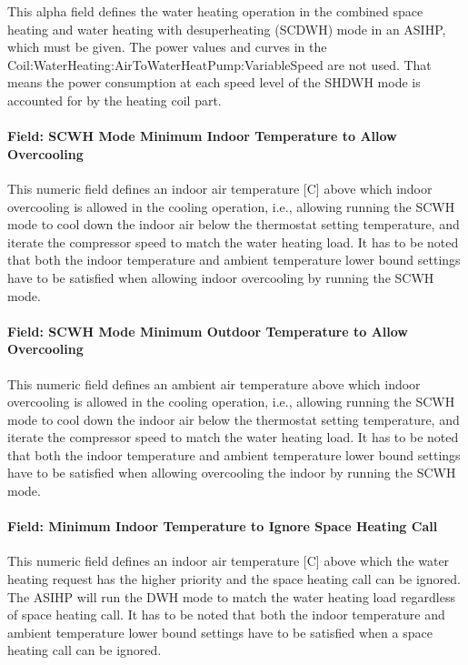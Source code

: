 This alpha field defines the water heating operation in the combined space heating and water heating with desuperheating (SCDWH) mode in an ASIHP, which must be given. The power values and curves in the Coil:WaterHeating:AirToWaterHeatPump:VariableSpeed are not used. That means the power consumption at each speed level of the SHDWH mode is accounted for by the heating coil part.

\paragraph{Field: SCWH Mode Minimum Indoor Temperature to Allow  Overcooling}\label{Field-SCWH-Minimum-In-Overcooling-ASIHP}

This numeric field defines an indoor air temperature [C] above which indoor overcooling is allowed in the cooling operation, i.e., allowing running the SCWH mode to cool down the indoor air below the thermostat setting temperature, and iterate the compressor speed to match the water heating load. It has to be noted that both the indoor temperature and ambient temperature lower bound settings have to be satisfied when allowing indoor overcooling by running the SCWH mode.


\paragraph{Field: SCWH Mode Minimum Outdoor Temperature to Allow Overcooling}\label{Field-SCWH-Minimum-Outdoor-ASIHP}

This numeric field defines an ambient air temperature above which indoor overcooling is allowed in the cooling operation, i.e., allowing running the SCWH mode to cool down the indoor air below the thermostat setting temperature, and iterate the compressor speed to match the water heating load. It has to be noted that both the indoor temperature and ambient temperature lower bound settings have to be satisfied when allowing overcooling the indoor by running the SCWH mode.

\paragraph{Field: Minimum Indoor Temperature to Ignore Space Heating Call}\label{Field-Minimum-Indoor-IgnoreSH-ASIHP}

This numeric field defines an indoor air temperature [C] above which the water heating request has the higher priority and the space heating call can be ignored. The ASIHP will run the DWH mode to match the water heating load regardless of space heating call. It has to be noted that both the indoor temperature and ambient temperature lower bound settings have to be satisfied when a space heating call can be ignored.


